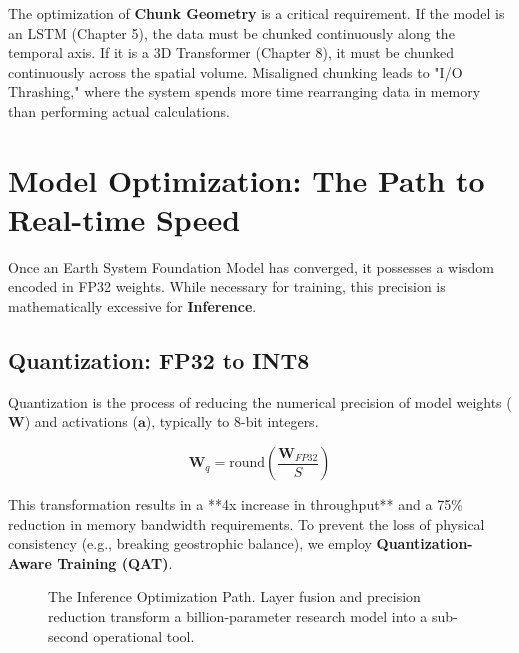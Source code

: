 The optimization of \textbf{Chunk Geometry} is a critical requirement. If the model is an LSTM (Chapter 5), the data must be chunked continuously along the temporal axis. If it is a 3D Transformer (Chapter 8), it must be chunked continuously across the spatial volume. Misaligned chunking leads to "I/O Thrashing," where the system spends more time rearranging data in memory than performing actual calculations.

\section{Model Optimization: The Path to Real-time Speed}

Once an Earth System Foundation Model has converged, it possesses a wisdom encoded in FP32 weights. While necessary for training, this precision is mathematically excessive for \textbf{Inference}. 

\subsection{Quantization: FP32 to INT8}
Quantization is the process of reducing the numerical precision of model weights ($\mathbf{W}$) and activations ($\mathbf{a}$), typically to 8-bit integers. 

\begin{equation}
\mathbf{W}_{q} = \text{round}\left( \frac{\mathbf{W}_{FP32}}{S} \right)
\end{equation}

This transformation results in a **4x increase in throughput** and a 75\% reduction in memory bandwidth requirements. To prevent the loss of physical consistency (e.g., breaking geostrophic balance), we employ \textbf{Quantization-Aware Training (QAT)}.

\begin{figure}[H]
\centering
{}
\caption{The Inference Optimization Path. Layer fusion and precision reduction transform a billion-parameter research model into a sub-second operational tool.}
\label{fig:optimization_tikz}
\end{figure}

